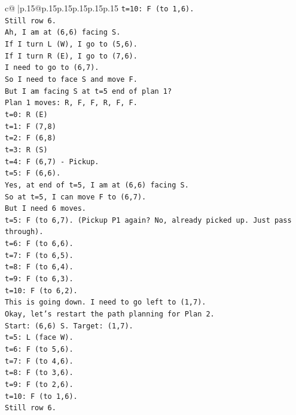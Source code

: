 \documentclass{article}
\begin{document}
{\begin{supertabular}{c@{$\;$}|p{.15\linewidth}@{}p{.15\linewidth}p{.15\linewidth}p{.15\linewidth}p{.15\linewidth}p{.15\linewidth}}
{{{\texttt{t=10: F (to 1,6).} \\
\texttt{Still row 6.} \\
\texttt{Ah, I am at (6,6) facing S.} \\
\texttt{If I turn L (W), I go to (5,6).} \\
\texttt{If I turn R (E), I go to (7,6).} \\
\texttt{I need to go to (6,7).} \\
\texttt{So I need to face S and move F.} \\
\texttt{But I am facing S at t=5 end of plan 1?} \\
\texttt{Plan 1 moves: R, F, F, R, F, F.} \\
\texttt{t=0: R (E)} \\
\texttt{t=1: F (7,8)} \\
\texttt{t=2: F (6,8)} \\
\texttt{t=3: R (S)} \\
\texttt{t=4: F (6,7) {-} Pickup.} \\
\texttt{t=5: F (6,6).} \\
\texttt{Yes, at end of t=5, I am at (6,6) facing S.} \\
\texttt{So at t=5, I can move F to (6,7).} \\
\texttt{But I need 6 moves.} \\
\texttt{t=5: F (to 6,7). (Pickup P1 again? No, already picked up. Just pass through).} \\
\texttt{t=6: F (to 6,6).} \\
\texttt{t=7: F (to 6,5).} \\
\texttt{t=8: F (to 6,4).} \\
\texttt{t=9: F (to 6,3).} \\
\texttt{t=10: F (to 6,2).} \\
\texttt{This is going down. I need to go left to (1,7).} \\
\texttt{Okay, let's restart the path planning for Plan 2.} \\
\texttt{Start: (6,6) S. Target: (1,7).} \\
\texttt{t=5: L (face W).} \\
\texttt{t=6: F (to 5,6).} \\
\texttt{t=7: F (to 4,6).} \\
\texttt{t=8: F (to 3,6).} \\
\texttt{t=9: F (to 2,6).} \\
\texttt{t=10: F (to 1,6).} \\
\texttt{Still row 6.} \\
}}}
\end{supertabular}}
\end{document}
